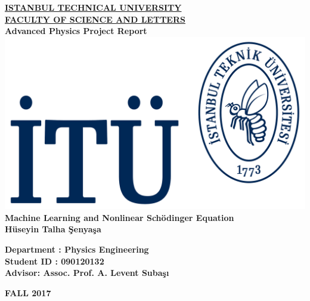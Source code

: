 \documentclass[a4paper,times,12pt]{article}
\begin{document}
\begin{titlepage}
\begin{center}
\vspace*{1cm}
\underline{\textbf{\Large ISTANBUL TECHNICAL UNIVERSITY}} \\[10 pt]

\underline{\textbf{\large FACULTY OF SCIENCE AND LETTERS}} \\[15 pt]

\textbf{\large Advanced Physics Project Report} \\
\vspace{1.8 cm}
\includegraphics[scale=0.2]{itu_logo.pdf} \\
\vspace{1.8 cm}
\textbf{\large Machine Learning and Nonlinear Sch{\"o}dinger Equation} \\[5 pt]
\textbf{H{\"u}seyin Talha \c{S}enya\c{s}a}\\
\vspace{1.5 cm}
\end{center}
\vfill
\noindent\textbf{{Department : Physics Engineering}}\\
    \textbf{Student ID \hspace{0.2 cm}: 090120132}\\
    \textbf{Advisor\hspace{1.1 cm}: Assoc. Prof. A. Levent Suba\c{s}{\i}}
\vspace{2 cm}

\center\textbf{FALL 2017}

\end{titlepage}


\setcounter{page}{1}
\end{document}
